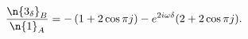 \begin{equation}
\frac{\n{3_\delta}_B}{\n{1}_A} = - \left(1 + 2\cos \pi j\right) - e^{2 i \omega \delta}(2+2\cos \pi j).
\end{equation}

